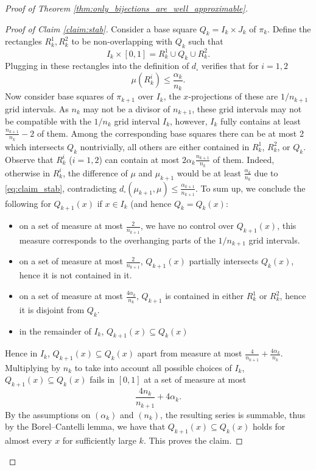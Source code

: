 \documentclass[10pt,a4paper]{amsart}
\begin{document}
\begin{proof}[Proof of Theorem \ref{thm:only_bijections_are_well_approximable}]
    \begin{proof}[Proof of Claim \ref{claim:stab}]
        Consider a base square $Q_k = I_k \times J_k$ of $\pi_k$. Define the rectangles $R_k^1, R_k^2$ to be non-overlapping with $Q_k$ such that $$I_k\times [0, 1] = R_k^1 \cup Q_k\cup R_k^2.$$
        Plugging in these rectangles into the definition of $d_\square$ verifies that for $i=1, 2$
        \begin{equation}\label{eq:claim_stab}
        \mu(R_k^i)\leq \frac{\alpha_k}{n_k}.
        \end{equation}
        Now consider base squares of $\pi_{k+1}$ over $I_k$, the $x$-projections of these are $1/n_{k+1}$ grid intervals. As $n_k$ may not be a divisor of $n_{k+1}$, these grid intervals may not be compatible with the $1/n_k$ grid interval $I_k$, however, $I_k$ fully contains at least $\frac{n_{k+1}}{n_k}-2$ of them. Among the corresponding base squares there can be at most 2 which intersects $Q_k$ nontrivially, all others are either contained in $R_k^1$, $R_k^2$, or $Q_k$. Observe that $R_k^i$ ($i=1, 2$) can contain at most $2\alpha_k \frac{n_{k+1}}{n_k}$ of them. Indeed, otherwise in $R_k^i$, the difference of $\mu$ and $\mu_{k+1}$ would be at least $\frac{\alpha_k}{n_k}$ due to \eqref{eq:claim_stab}, contradicting $d_\square(\mu_{k+1}, \mu)\leq \frac{\alpha_{k+1}}{n_{k+1}}$. To sum up, we conclude the following for $Q_{k+1}(x)$ if $x\in I_k$ (and hence $Q_k = Q_k(x)$:
        \begin{itemize}
            \item on a set of measure at most $\frac{2}{n_{k+1}}$, we have no control over $Q_{k+1}(x)$, this measure corresponds to the overhanging parts of the $1/n_{k+1}$ grid intervals.
            \item on a set of measure at most $\frac{2}{n_{k+1}}$, $Q_{k+1}(x)$ partially intersects $Q_k(x)$, hence it is not contained in it.
            \item on a set of measure at most $\frac{4\alpha_k}{n_k}$, $Q_{k+1}$ is contained in either $R_k^1$ or $R_k^2$, hence it is disjoint from $Q_k$.
            \item in the remainder of $I_k$, $Q_{k+1}(x)\subseteq Q_k(x)$
        \end{itemize}
        Hence in $I_k$, $Q_{k+1}(x)\subseteq Q_k(x)$ apart from measure at most $\frac{4}{n_{k+1}} + \frac{4\alpha_k}{n_k}$.
        Multiplying by $n_k$ to take into account all possible choices of $I_k$, $Q_{k+1}(x)\subseteq Q_k(x)$ fails in $[0,1]$ at a set of measure at most
        $$\frac{4n_k}{n_{k+1}} + 4\alpha_k.$$
        By the assumptions on $(\alpha_k)$ and $(n_k)$, the resulting series is summable, thus by the Borel--Cantelli lemma, we have that $Q_{k+1}(x)\subseteq Q_k(x)$ holds for almost every $x$ for sufficiently large $k$. This proves the claim.
    \end{proof}


\end{proof}
\end{document}
